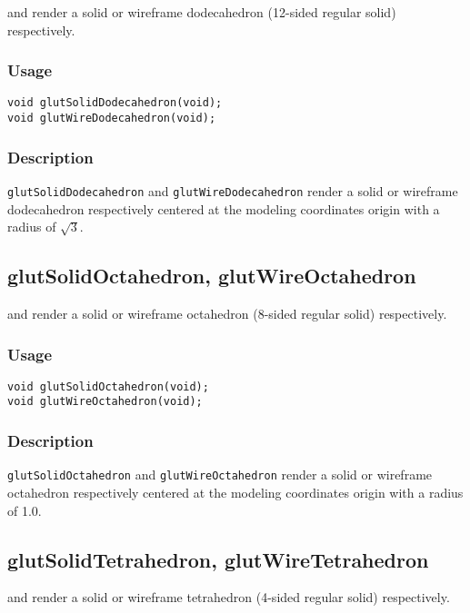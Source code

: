  and  render a solid or wireframe
dodecahedron (12-sided regular solid) respectively.

\subsubsection*{Usage}
\begin{verbatim}
void glutSolidDodecahedron(void);
void glutWireDodecahedron(void);
\end{verbatim}

\subsubsection*{Description}

{\tt glutSolidDodecahedron} and {\tt glutWireDodecahedron} render a solid or wireframe
dodecahedron respectively centered at the modeling coordinates origin with a radius of $\sqrt{3}$.

\subsection{glutSolidOctahedron, glutWireOctahedron}

 and  render a solid or
wireframe octahedron (8-sided regular solid) respectively.

\subsubsection*{Usage}
\begin{verbatim}
void glutSolidOctahedron(void);
void glutWireOctahedron(void);
\end{verbatim}

\subsubsection*{Description}

{\tt glutSolidOctahedron} and {\tt glutWireOctahedron} render a solid or
wireframe octahedron respectively centered at the modeling coordinates origin with a radius of 1.0.

\subsection{glutSolidTetrahedron, glutWireTetrahedron}

 and  render a solid or wireframe
tetrahedron (4-sided regular solid) respectively.

